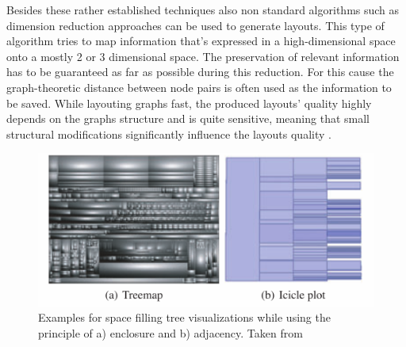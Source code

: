 Besides these rather established techniques also non standard algorithms such as dimension reduction approaches can be used to generate layouts. This type of algorithm tries to map information that's expressed in a high-dimensional space onto a mostly 2 or 3 dimensional space. The preservation of relevant information has to be guaranteed as far as possible during this reduction. For this cause the graph-theoretic distance between node pairs is often used as the information to be saved. While layouting graphs fast, the produced layouts' quality highly depends on the graphs structure and is quite sensitive, meaning that small structural modifications significantly influence the layouts quality\cite{Gibson2013} \cite{VonLandesberger2011}.

\begin{figure}
    \centering
    \includegraphics{media/space_filling_trees.pdf}
    \caption{Examples for space filling tree visualizations while using the principle of a) enclosure and b) adjacency. Taken from \cite{VonLandesberger2011}}
    \label{fig:space_filling_trees}
\end{figure}

